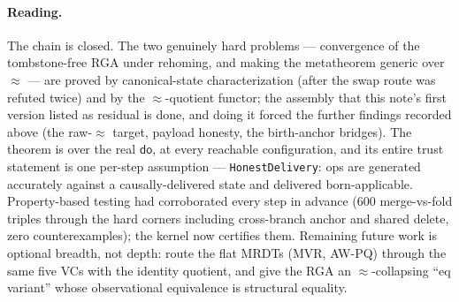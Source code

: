 \documentclass[11pt]{article}
\theoremstyle{definition}
\theoremstyle{remark}
\newcommand{\dodo}{\mathsf{do}}
\newcommand{\eqobs}{\approx}
\newcommand{\lean}[1]{\texttt{#1}}
\begin{document}
\paragraph{Reading.} The chain is closed. The two genuinely hard problems --- convergence
of the tombstone-free RGA under rehoming, and making the metatheorem generic over $\eqobs$ ---
are proved by canonical-state characterization (after the swap route was refuted twice) and by
the $\eqobs$-quotient functor; the assembly that this note's first version listed as residual
is done, and doing it forced the further findings recorded above (the raw-$\eqobs$ target,
payload honesty, the birth-anchor bridges). The theorem is over the real $\dodo$, at every
reachable configuration, and its entire trust statement is one per-step assumption ---
\lean{HonestDelivery}: ops are generated accurately against a causally-delivered state and
delivered born-applicable. Property-based testing had corroborated every step in advance (600
merge-vs-fold triples through the hard corners including cross-branch anchor and shared delete,
zero counterexamples); the kernel now certifies them. Remaining future work is optional
breadth, not depth: route the flat MRDTs (MVR, AW-PQ) through the same five VCs with the
identity quotient, and give the RGA an $\eqobs$-collapsing ``eq variant'' whose observational
equivalence is structural equality.
\end{document}
